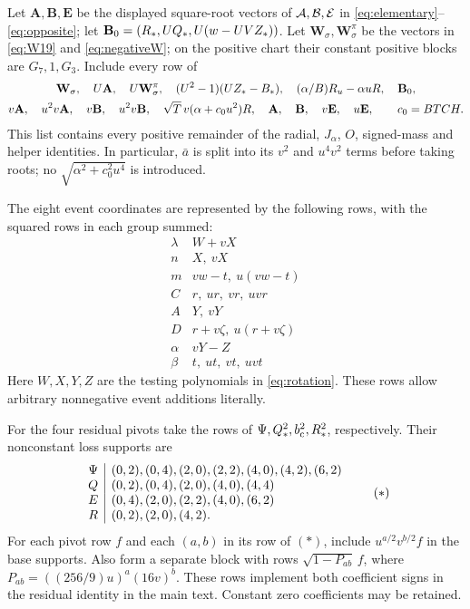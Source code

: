 Let $\mathbf A,\mathbf B,\mathbf E$ be the displayed square-root
vectors of $\mathcal A,\mathcal B,\mathcal E$ in \eqref{eq:elementary}--\eqref{eq:opposite};
let $\mathbf B_0=(R_*,UQ_*,U(w-UVZ_*))$.
Let $\mathbf W_\sigma,\mathbf W^\pi_\sigma$ be the vectors in
\eqref{eq:W19} and \eqref{eq:negativeW}; on the positive chart their
constant positive blocks are $G_7,1,G_3$. Include every row of
\begin{gather*}
 \mathbf W_\sigma,\quad U\mathbf A,\quad
 U\mathbf W^\pi_\sigma,\quad (U^2-1)(UZ_*-B_*),\quad
 (\alpha/B)R_u-\alpha uR,\quad\mathbf B_0,\\
 v\mathbf A,\quad u^2v\mathbf A,\quad
 v\mathbf B,\quad u^2v\mathbf B,\quad
 \sqrt T\,v(\alpha+c_0u^2)R,\quad
 \mathbf A,\quad\mathbf B,\quad v\mathbf E,\quad u\mathbf E,
 \qquad c_0=BTCH.
\end{gather*}
This list contains every positive remainder of the radial, $J_\alpha$,
$O$, signed-mass and helper identities. In particular, $\bar a$ is
split into its $v^2$ and $u^4v^2$ terms before taking roots; no
$\sqrt{\alpha^2+c_0^2u^4}$ is introduced.

The eight event coordinates are represented by the following rows,
with the squared rows in each group summed:
\[
\begin{array}{c|l}
 \lambda&W+vX\\
 n&X,\ vX\\
 m&vw-t,\ u(vw-t)\\
 C&r,\ ur,\ vr,\ uvr\\
 A&Y,\ vY\\
 D&r+v\zeta,\ u(r+v\zeta)\\
 \alpha&vY-Z\\
 \beta&t,\ ut,\ vt,\ uvt
\end{array}
\]
Here $W,X,Y,Z$ are the testing polynomials in \eqref{eq:rotation}.
These rows allow arbitrary nonnegative event additions literally.

For the four residual pivots take the rows of $\Psi,Q_*^2,b_{\mathrm c}^2,R_*^2$,
respectively. Their nonconstant loss supports are
\[
\begin{array}{c|l}
 \Psi&(0,2),(0,4),(2,0),(2,2),(4,0),(4,2),(6,2)\\
 Q&(0,2),(0,4),(2,0),(4,0),(4,4)\\
 E&(0,4),(2,0),(2,2),(4,0),(6,2)\\
 R&(0,2),(2,0),(4,2).
\end{array}\tag{\(*\)}
\]
For each pivot row $f$ and each $(a,b)$ in its row of $(*)$, include
$u^{a/2}v^{b/2}f$ in the base supports. Also form a separate block with
rows $\sqrt{1-P_{ab}}\,f$, where
$P_{ab}=((256/9)u)^a(16v)^b$.
These rows implement both coefficient signs in the residual identity
in the main text. Constant zero coefficients may be retained.

